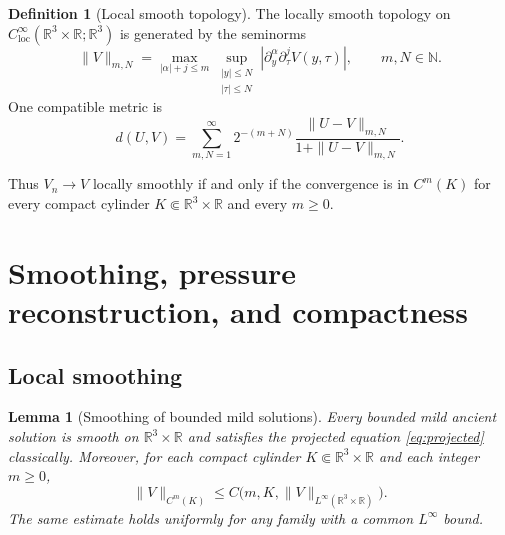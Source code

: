 \documentclass[11pt]{amsart}
\theoremstyle{plain}
\newtheorem{lemma}[theorem]{Lemma}
\theoremstyle{definition}
\newtheorem{definition}[theorem]{Definition}
\theoremstyle{remark}
\numberwithin{equation}{section}
\newcommand{\R}{\mathbb R}
\newcommand{\N}{\mathbb N}
\newcommand{\loc}{\mathrm{loc}}
\begin{document}
\begin{definition}[Local smooth topology]\label{def:local-smooth-topology}
The locally smooth topology on \(C^\infty_{\loc}(\R^3\times\R;\R^3)\) is
generated by the seminorms
\[
   \|V\|_{m,N}
   =
   \max_{|\alpha|+j\le m}
   \sup_{\substack{|y|\le N\\ |\tau|\le N}}
   |\partial_y^\alpha\partial_\tau^jV(y,\tau)|,
   \qquad m,N\in\N .
\]
One compatible metric is
\[
   d(U,V)
   =
   \sum_{m,N=1}^{\infty}
   2^{-(m+N)}
   \frac{\|U-V\|_{m,N}}{1+\|U-V\|_{m,N}}.
\]
\end{definition}

Thus \(V_n\to V\) locally smoothly if and only if the convergence is in
\(C^m(K)\) for every compact cylinder
\(K\Subset\R^3\times\R\) and every \(m\ge0\).

\section{Smoothing, pressure reconstruction, and compactness}
\label{sec:smoothing-compactness}

\subsection{Local smoothing}

\begin{lemma}[Smoothing of bounded mild solutions]\label{lem:mild-smoothing}
Every bounded mild ancient solution is smooth on \(\R^3\times\R\) and satisfies
the projected equation \eqref{eq:projected} classically.  Moreover, for each
compact cylinder \(K\Subset\R^3\times\R\) and each integer \(m\ge0\),
\[
   \|V\|_{C^m(K)}
   \le
   C\bigl(m,K,\|V\|_{L^\infty(\R^3\times\R)}\bigr).
\]
The same estimate holds uniformly for any family with a common
\(L^\infty\) bound.
\end{lemma}
\end{document}
